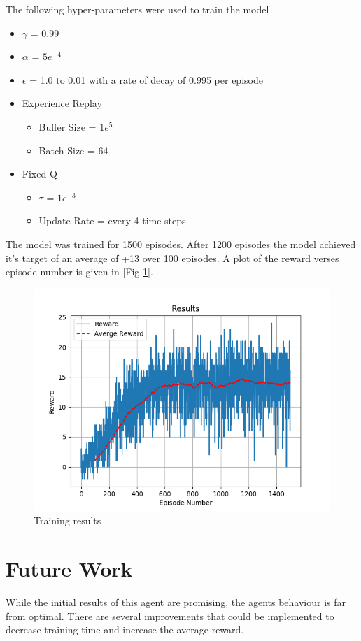 \documentclass[12pt]{article}
\begin{document}
The following hyper-parameters were used to train the model
\begin{itemize}
	\item $\gamma$ = $0.99$
	\item $\alpha$ = $5e^{-4}$
	\item $\epsilon$ = 1.0 to 0.01 with a rate of decay of 0.995 per episode
	\item Experience Replay
	\begin{itemize}
		\item Buffer Size = $1e^{5}$
		\item Batch Size = $64$
	\end{itemize}
	\item Fixed Q 
	\begin{itemize}
		\item $\tau$ = $1e^{-3}$
		\item Update Rate = every 4 time-steps 
	\end{itemize}
\end{itemize}

The model was trained for 1500 episodes. 
After 1200 episodes the model achieved it's target of an average of +13 over 100 episodes.
A plot of the reward verses episode number is given in [Fig \ref{results}].

\begin{figure}
	\includegraphics[width=\linewidth]{./img/Results.png}
	\caption{Training results}
	\label{results}
\end{figure}

\section{Future Work}
While the initial results of this agent are promising, the agents behaviour is far from optimal.
There are several improvements that could be implemented to decrease training time and increase the average reward.
\end{document}
